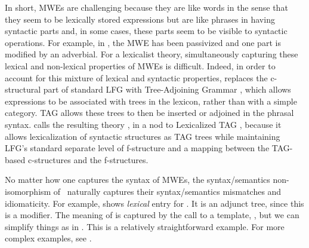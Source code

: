 \documentclass[output=paper,hidelinks]{langscibook}
\begin{document}
In short, MWEs are challenging because they are
like words in the sense that they seem to be lexically stored
expressions but are like phrases in having syntactic parts and, in
some cases, these parts seem to be visible to syntactic
operations. For example, in
, the MWE has
been passivized and one part is modified by an adverbial. For a
lexicalist theory, simultaneously capturing these lexical and
non-lexical properties of MWEs is difficult. Indeed, in order to
account for this mixture of lexical and syntactic properties,
\citet{findlay2019} replaces the c-structural part of standard LFG
with Tree-Adjoining Grammar \citep[TAG;][]{joshi-etal1975,abeille-rambow2000book}, which allows expressions to be
associated with trees in the lexicon, rather than with a simple
category. TAG allows these trees to then be inserted or adjoined in
the phrasal syntax. \citet{findlay2019} calls the resulting
theory , in a nod to Lexicalized TAG \citep{schabes-etal1988},
because it allows lexicalization of syntactic structures as TAG
trees while maintaining LFG's standard separate level of f-structure and a mapping
between the TAG-based c-structures and the f-structures. 

No matter how one captures the syntax of MWEs, the syntax/semantics
non-isomorphism of \glues\ naturally captures their syntax/semantics
mismatches and idiomaticity. For example, 
shows  \emph{lexical} entry for . It is an adjunct tree, since this is a modifier. The
meaning of  is captured by the call to a template,
, but we can simplify things as in
.
\ea
\label{ex:by-and-large} 
\z
%
This is a relatively straightforward example. For more complex
examples, see \citet{findlay2019}.
\end{document}
